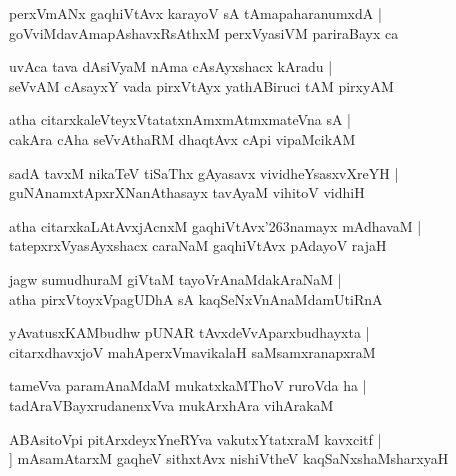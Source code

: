 \documentclass[twoside,12pt,openright]{book}
\def\S{\char'263}
\newcounter{shloka}[chapter]
\begin{document}
\begin{shloka}%
perxVmANx gaqhiVtAvx karayoV sA tAmapaharanumxdA |\\
goVviMdavAmapAshavxRsAthxM perxVyasiVM pariraBayx ca 
\end{shloka}

\begin{shloka}%
uvAca tava dAsiVyaM nAma cAsAyxshacx kAradu |\\
seVvAM cAsayxY vada pirxVtAyx yathABiruci tAM  pirxyAM 
\end{shloka}

\begin{shloka}%
atha citarxkaleVteyxVtatatxnAmxmAtmxmateVna sA |\\
cakAra cAha seVvAthaRM dhaqtAvx cApi vipaMcikAM 
\end{shloka}

\begin{shloka}%
sadA tavxM nikaTeV tiSaThx gAyasavx vividheYsasxvXreYH |\\
guNAnamxtApxrXNanAthasayx tavAyaM vihitoV vidhiH 
\end{shloka}

\begin{shloka}%
atha citarxkaLAtAvxjAcnxM gaqhiVtAvx\S namayx mAdhavaM |\\
tatepxrxVyasAyxshacx caraNaM gaqhiVtAvx pAdayoV rajaH 
\end{shloka}

\begin{shloka}%
jagw sumudhuraM giVtaM tayoVrAnaMdakAraNaM |\\
atha pirxVtoyxVpagUDhA sA kaqSeNxVnAnaMdamUtiRnA 
\end{shloka}

\begin{shloka}%
yAvatusxKAMbudhw pUNAR tAvxdeVvAparxbudhayxta |\\
citarxdhavxjoV mahAperxVmavikalaH saMsamxranapxraM 
\end{shloka}

\begin{shloka}%
tameVva paramAnaMdaM mukatxkaMThoV ruroVda ha |\\
tadAraVBayxrudanenxVva mukArxhAra vihArakaM 
\end{shloka}

\begin{shloka}%
ABAsitoVpi pitArxdeyxYneRYva vakutxYtatxraM kavxcitf |\\]
mAsamAtarxM gaqheV sithxtAvx nishiVtheV kaqSaNxshaMsharxyaH
\end{shloka}
\end{document}

